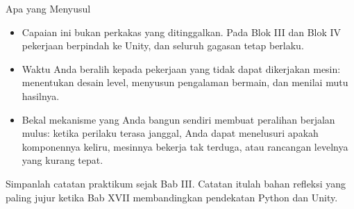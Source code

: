 \documentclass[aspectratio=169,10pt]{beamer}
\begin{document}
\begin{frame}{Apa yang Menyusul}
\begin{itemize}
  \item Capaian ini bukan perkakas yang ditinggalkan. Pada Blok III dan Blok IV
        pekerjaan berpindah ke Unity, dan seluruh gagasan tetap berlaku.
  \item Waktu Anda beralih kepada pekerjaan yang tidak dapat dikerjakan mesin:
        menentukan desain level, menyusun pengalaman bermain, dan menilai mutu
        hasilnya.
  \item Bekal mekanisme yang Anda bangun sendiri membuat peralihan berjalan
        mulus: ketika perilaku terasa janggal, Anda dapat menelusuri apakah
        komponennya keliru, mesinnya bekerja tak terduga, atau rancangan
        levelnya yang kurang tepat.
\end{itemize}
\vspace{0.1cm}
\begin{kiat}
Simpanlah catatan praktikum sejak Bab III. Catatan itulah bahan refleksi yang
paling jujur ketika Bab XVII membandingkan pendekatan Python dan Unity.
\end{kiat}
\end{frame}
\end{document}
